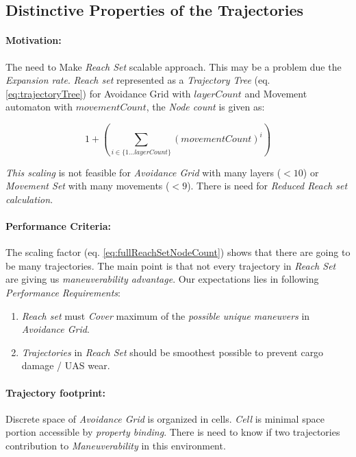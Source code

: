 \subsection{Distinctive Properties of the Trajectories}\label{s:ReachSetPerformanceCriteria}

\paragraph{Motivation:} The need to Make \emph{Reach Set} scalable approach. This may be a problem due the \emph{Expansion rate}. \emph{Reach set} represented as a \emph{Trajectory Tree} (eq. \ref{eq:trajectoryTree}) for Avoidance Grid with $layerCount$ and Movement automaton with $movementCount$, the \emph{Node count} is given as:

\begin{equation}\label{eq:fullReachSetNodeCount}
    1+ \left(\sum_{i\in\{1\dots layerCount\}} (movementCount)^i\right)
\end{equation}

\noindent \emph{This scaling} is not feasible for \emph{Avoidance Grid} with many layers ($< 10$) or \emph{Movement Set} with many movements ($< 9$). There is need for \emph{Reduced Reach set calculation}.

\paragraph{Performance Criteria:} The scaling factor (eq. \ref{eq:fullReachSetNodeCount}) shows that there are going to be many trajectories. The main point is that not every trajectory in \emph{Reach Set} are giving us \emph{maneuverability advantage}. Our expectations lies in following \emph{Performance Requirements}:

\begin{enumerate}
    \item \emph{Reach set} must \emph{Cover} maximum of the \emph{possible unique maneuvers} in  \emph{Avoidance Grid}.
    \item \emph{Trajectories} in \emph{Reach Set} should be smoothest possible to prevent cargo damage / UAS wear.
\end{enumerate}

\paragraph{Trajectory footprint:} Discrete space of \emph{Avoidance Grid} is organized in cells. \emph{Cell} is minimal space portion accessible by \emph{property binding}. There is need to know if two trajectories contribution to \emph{Maneuverability} in this environment. 

